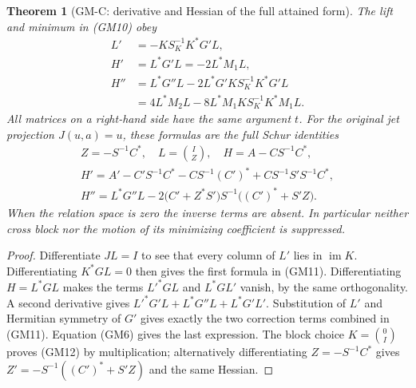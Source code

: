 \documentclass[11pt]{article}
\newtheorem{theorem}{Theorem}
\theoremstyle{remark}\newtheorem{remark}[theorem]{Remark}
\begin{document}
\begin{theorem}[GM-C: derivative and Hessian of the full attained form]
The lift and minimum in (GM10) obey
\begin{equation}\tag{GM11}
 \begin{split}
 L'&=-K S_K^{-1}K^*G'L,\\
 H'&=L^*G'L=-2L^*M_1L,\\
 H''&=L^*G''L-2L^*G'K S_K^{-1}K^*G'L\\
     &=4L^*M_2L-8L^*M_1K S_K^{-1}K^*M_1L.
 \end{split}
\end{equation}
All matrices on a right-hand side have the same argument $t$.
For the original jet projection $J(u,a)=u$, these formulas are the
full Schur identities
\begin{equation}\tag{GM12}
 \begin{gathered}
 Z=-S^{-1}C^*,\quad L=\binom{I}{Z},\quad H=A-CS^{-1}C^*,\\
 H'=A'-C'S^{-1}C^*-CS^{-1}(C')^*
                       +CS^{-1}S'S^{-1}C^*,\\
 H''=L^*G''L
     -2\bigl(C'+Z^*S'\bigr)S^{-1}\bigl((C')^*+S'Z\bigr).
 \end{gathered}
\end{equation}
When the relation space is zero the inverse terms are absent.
In particular neither cross block nor the motion of its minimizing
coefficient is suppressed.
\end{theorem}
\begin{proof}
Differentiate $JL=I$ to see that every column of $L'$ lies in
$\operatorname{im}K$.  Differentiating $K^*GL=0$ then gives the first
formula in (GM11).  Differentiating $H=L^*GL$ makes the terms
$L'^*GL$ and $L^*GL'$ vanish, by the same orthogonality.  A second
derivative gives $L'^*G'L+L^*G''L+L^*G'L'$.  Substitution of $L'$
and Hermitian symmetry of $G'$ gives exactly the two correction terms
combined in (GM11).  Equation (GM6) gives the last expression.
The block choice $K=\binom0I$ proves (GM12) by multiplication;
alternatively differentiating $Z=-S^{-1}C^*$ gives
$Z'=-S^{-1}((C')^*+S'Z)$ and the same Hessian.
\end{proof}
\end{document}
